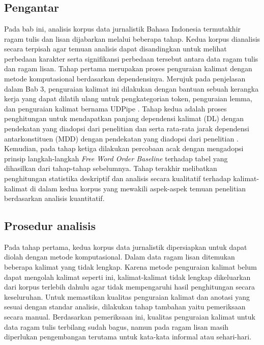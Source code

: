 \chapter{\babEmpat} \label{chap:analisis}

\section{Pengantar}
Pada bab ini, analisis korpus data jurnalistik Bahasa Indonesia termutakhir ragam tulis dan lisan dijabarkan melalui beberapa tahap. Kedua korpus dianalisis secara terpisah agar temuan analisis dapat disandingkan untuk melihat perbedaan karakter serta signifikansi perbedaan tersebut antara data ragam tulis dan ragam lisan. Tahap pertama merupakan proses penguraian kalimat dengan metode komputasional berdasarkan dependensinya. Merujuk pada penjelasan dalam Bab 3, penguraian kalimat ini dilakukan dengan bantuan sebuah kerangka kerja yang dapat dilatih ulang untuk pengkategorian token, penguraian lemma, dan penguraian kalimat bernama UDPipe \citep{udpipe2017}. Tahap kedua adalah proses penghitungan untuk mendapatkan panjang dependensi kalimat (DL) dengan pendekatan yang diadopsi dari penelitian \cite{gildea2010grammars} dan \cite{futrell2015large} serta rata-rata jarak dependensi antarkonstituen (MDD) dengan pendekatan yang diadopsi dari penelitian \cite{liu2017dependency}. Kemudian, pada tahap ketiga dilakukan percobaan acak dengan mengadopsi prinsip langkah-langkah \textit{Free Word Order Baseline} \citep{futrell2015large} terhadap tabel yang dihasilkan dari tahap-tahap sebelumnya. Tahap terakhir melibatkan penghitungan statistika deskriptif dan analisis secara kualitatif terhadap kalimat-kalimat di dalam kedua korpus yang mewakili aspek-aspek temuan penelitian berdasarkan analisis kuantitatif.

\section{Prosedur analisis}
Pada tahap pertama, kedua korpus data jurnalistik dipersiapkan untuk dapat diolah dengan metode komputasional. Dalam data ragam lisan ditemukan beberapa kalimat yang tidak lengkap. Karena metode penguraian kalimat belum dapat mengolah kalimat seperti ini, kalimat-kalimat tidak lengkap dikeluarkan dari korpus terlebih dahulu agar tidak mempengaruhi hasil penghitungan secara keseluruhan. Untuk memastikan kualitas penguraian kalimat dan anotasi yang sesuai dengan standar analisis, dilakukan tahap tambahan yaitu pemeriksaan secara manual. Berdasarkan pemeriksaan ini, kualitas penguraian kalimat untuk data ragam tulis terbilang sudah bagus, namun pada ragam lisan masih diperlukan pengembangan terutama untuk kata-kata informal atau sehari-hari. 

